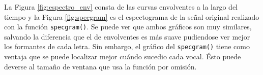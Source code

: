 

		La Figura \ref{fig:espectro_env} consta de las curvas envolventes a la largo del tiempo y la Figura \ref{fig:specgram} es el espectograma de la señal original realizado con la función \texttt{specgram()}. Se puede ver que ambos gráficos son muy similares, salvando la diferencia que el de envolventes es más suave pudiendose ver mejor los formantes de cada letra. Sin embargo, el gráfico del \texttt{specgram()} tiene como ventaja que se puede localizar mejor cuándo sucedio cada vocal. Ésto puede deverse al tamaño de ventana que usa la función por omisión.
